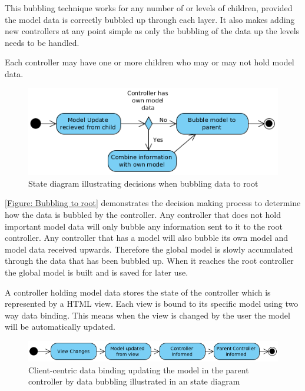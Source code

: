 This bubbling technique works for any number of or levels of children, provided the model data is correctly bubbled up through each layer. It also makes adding new controllers at any point simple as only the bubbling of the data up the levels needs to be handled.

Each controller may have one or more children who may or may not hold model data.

\begin{figure}[h]
	\centering
		\includegraphics[scale=0.6]{../figures/authoring_tool/bubbling_to_root.png} 		
	\caption{\label{Figure: Bubbling to root} State diagram illustrating decisions when bubbling data to root} 	
\end{figure}

\autoref{Figure: Bubbling to root} demonstrates the decision making process to determine how the data is bubbled by the controller. Any controller that does not hold important model data will only bubble any information sent to it to the root controller. Any controller that has a model will also bubble its own model and model data received upwards. Therefore the global model is slowly accumulated through the data that has been bubbled up. When it reaches the root controller the global model is built and is saved for later use.

A controller holding model data stores the state of the controller which is represented by a HTML view. Each view is bound to its specific model using two way data binding. This means when the view is changed by the user the model will be automatically updated.

\begin{figure}[h]
	\centering
		\includegraphics[scale=0.6]{../figures/authoring_tool/two_way_binding.png} 		
	\caption{\label{Figure: Authoring two way binding} Client-centric data binding updating the model in the parent controller by data bubbling illustrated in an state diagram} 	
\end{figure}

